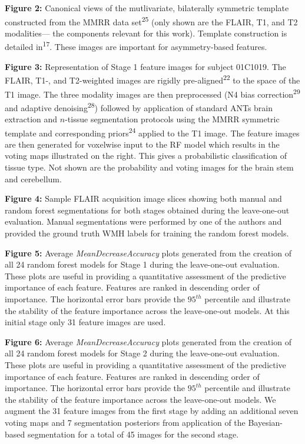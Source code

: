 \documentclass[11pt,]{article}
\begin{document}
\textbf{Figure 2:} Canonical views of the mutlivariate, bilaterally
symmetric template constructed from the MMRR data
set\textsuperscript{25} (only shown are the FLAIR, T1, and T2
modalities--- the components relevant for this work). Template
construction is detailed in\textsuperscript{17}. These images are
important for asymmetry-based features.

\textbf{Figure 3:} Representation of Stage 1 feature images for subject
01C1019. The FLAIR, T1-, and T2-weighted images are rigidly
pre-aligned\textsuperscript{22} to the space of the T1 image. The three
modality images are then preprocessed (N4 bias
correction\textsuperscript{29} and adaptive
denoising\textsuperscript{28}) followed by application of standard ANTs
brain extraction and \(n\)-tissue segmentation protocols using the MMRR
symmetric template and corresponding priors\textsuperscript{24} applied
to the T1 image. The feature images are then generated for voxelwise
input to the RF model which results in the voting maps illustrated on
the right. This gives a probabilistic classification of tissue type. Not
shown are the probability and voting images for the brain stem and
cerebellum.

\textbf{Figure 4:} Sample FLAIR acquisition image slices showing both
manual and random forest segmentations for both stages obtained during
the leave-one-out evaluation. Manual segmentations were performed by one
of the authors and provided the ground truth WMH labels for training the
random forest models.

\textbf{Figure 5:} Average \emph{MeanDecreaseAccuracy} plots generated
from the creation of all 24 random forest models for Stage 1 during the
leave-one-out evaluation. These plots are useful in providing a
quantitative assessment of the predictive importance of each feature.
Features are ranked in descending order of importance. The horizontal
error bars provide the \(95^{th}\) percentile and illustrate the
stability of the feature importance across the leave-one-out models. At
this initial stage only 31 feature images are used.

\textbf{Figure 6:} Average \emph{MeanDecreaseAccuracy} plots generated
from the creation of all 24 random forest models for Stage 2 during the
leave-one-out evaluation. These plots are useful in providing a
quantitative assessment of the predictive importance of each feature.
Features are ranked in descending order of importance. The horizontal
error bars provide the \(95^{th}\) percentile and illustrate the
stability of the feature importance across the leave-one-out models. We
augment the 31 feature images from the first stage by adding an
additional seven voting maps and 7 segmentation posteriors from
application of the Bayesian-based segmentation for a total of 45 images
for the second stage.
\end{document}
